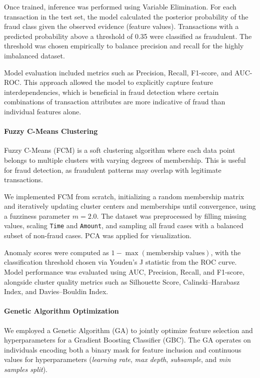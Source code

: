 \documentclass{article}
\begin{document}
Once trained, inference was performed using Variable Elimination. For each transaction in the test set, the model calculated the posterior probability of the fraud class given the observed evidence (feature values). Transactions with a predicted probability above a threshold of 0.35 were classified as fraudulent. The threshold was chosen empirically to balance precision and recall for the highly imbalanced dataset.

Model evaluation included metrics such as Precision, Recall, F1-score, and AUC-ROC. This approach allowed the model to explicitly capture feature interdependencies, which is beneficial in fraud detection where certain combinations of transaction attributes are more indicative of fraud than individual features alone.

\paragraph{Fuzzy C-Means Clustering}
Fuzzy C-Means (FCM) is a soft clustering algorithm where each data point belongs to multiple clusters with varying degrees of membership. This is useful for fraud detection, as fraudulent patterns may overlap with legitimate transactions. 

We implemented FCM from scratch, initializing a random membership matrix and iteratively updating cluster centers and memberships until convergence, using a fuzziness parameter $m=2.0$. The dataset was preprocessed by filling missing values, scaling \texttt{Time} and \texttt{Amount}, and sampling all fraud cases with a balanced subset of non-fraud cases. PCA was applied for visualization.

Anomaly scores were computed as $1 - \max(\text{membership values})$, with the classification threshold chosen via Youden’s J statistic from the ROC curve. Model performance was evaluated using AUC, Precision, Recall, and F1-score, alongside cluster quality metrics such as Silhouette Score, Calinski–Harabasz Index, and Davies–Bouldin Index.


\paragraph{Genetic Algorithm Optimization}
We employed a Genetic Algorithm (GA) to jointly optimize feature selection and hyperparameters for a Gradient Boosting Classifier (GBC). The GA operates on individuals encoding both a binary mask for feature inclusion and continuous values for hyperparameters (\textit{learning rate}, \textit{max depth}, \textit{subsample}, and \textit{min samples split}). 
\end{document}
